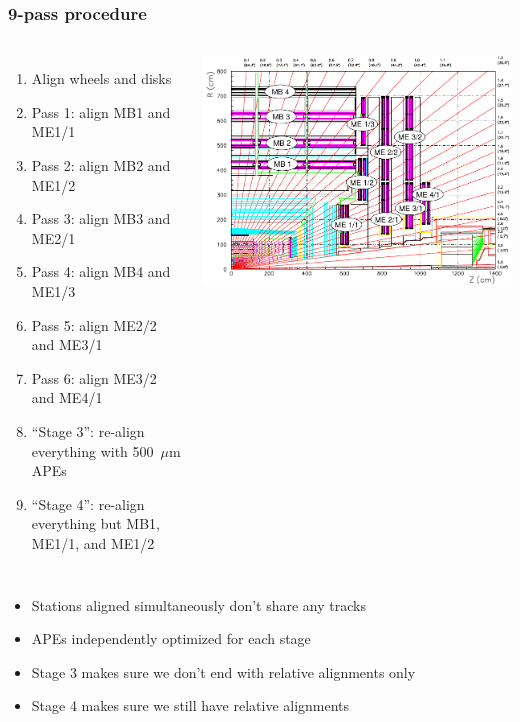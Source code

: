 \documentclass[compress]{beamer}
\begin{document}
\begin{frame}
\frametitle{9-pass procedure}
\begin{columns}
\scriptsize
\begin{enumerate}\setlength{\itemsep}{0.05 cm}
\item Align wheels and disks
\item Pass 1: align MB1 and ME1/1
\item Pass 2: align MB2 and ME1/2
\item Pass 3: align MB3 and ME2/1
\item Pass 4: align MB4 and ME1/3
\item Pass 5: align ME2/2 and ME3/1
\item Pass 6: align ME3/2 and ME4/1
\item ``Stage 3'': re-align everything with 500~$\mu$m APEs
\item ``Stage 4'': re-align everything but MB1, ME1/1, and ME1/2
\end{enumerate}
\includegraphics[width=\linewidth]{muon_system_labeled.pdf}
\end{columns}

\vspace{0.2 cm}
\begin{itemize}\setlength{\itemsep}{0.1 cm}
\item Stations aligned simultaneously don't share any tracks
\item APEs independently optimized for each stage
\item Stage 3 makes sure we don't end with relative alignments only
\item Stage 4 makes sure we still have relative alignments
\end{itemize}
\end{frame}
\end{document}
